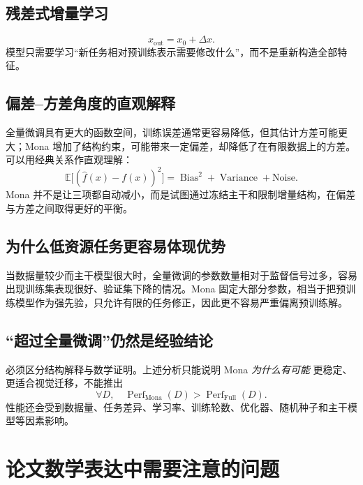 \documentclass[UTF8,12pt,a4paper,fontset=none]{ctexart}
\begin{document}
\subsection{残差式增量学习}
\begin{equation}
 x_{\mathrm{out}}=x_0+\Delta x.
\end{equation}
模型只需要学习“新任务相对预训练表示需要修改什么”，而不是重新构造全部特征。



\subsection{偏差--方差角度的直观解释}

全量微调具有更大的函数空间，训练误差通常更容易降低，但其估计方差可能更大；Mona 增加了结构约束，可能带来一定偏差，却降低了在有限数据上的方差。可以用经典关系作直观理解：
\begin{equation}
 \mathbb{E}\big[(\widehat f(x)-f(x))^2\big]
 =\operatorname{Bias}^2+\operatorname{Variance}+\text{Noise}.
\end{equation}
Mona 并不是让三项都自动减小，而是试图通过冻结主干和限制增量结构，在偏差与方差之间取得更好的平衡。

\subsection{为什么低资源任务更容易体现优势}

当数据量较少而主干模型很大时，全量微调的参数数量相对于监督信号过多，容易出现训练集表现很好、验证集下降的情况。Mona 固定大部分参数，相当于把预训练模型作为强先验，只允许有限的任务修正，因此更不容易严重偏离预训练解。

\subsection{“超过全量微调”仍然是经验结论}

必须区分结构解释与数学证明。上述分析只能说明 Mona \emph{为什么有可能} 更稳定、更适合视觉迁移，不能推出
\begin{equation}
 \forall D,\quad
 \operatorname{Perf}_{\mathrm{Mona}}(D)
 >\operatorname{Perf}_{\mathrm{Full}}(D).
\end{equation}
性能还会受到数据量、任务差异、学习率、训练轮数、优化器、随机种子和主干模型等因素影响。

\section{论文数学表达中需要注意的问题}
\end{document}
